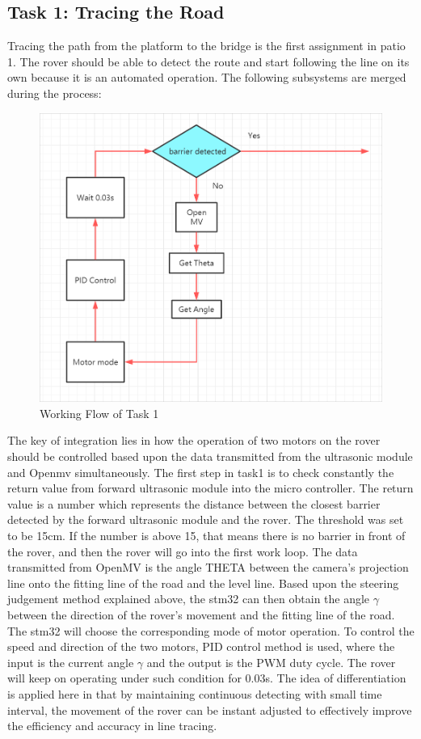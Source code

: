 \documentclass[12pt, a4paper, oneside]{report}
\begin{document}
\subsection{Task 1: Tracing the Road}
Tracing the path from the platform to the bridge is the first assignment in patio 1. The rover should be able to detect the route and start following the line on its own because it is an automated operation. The following subsystems are merged during the process:
\begin{figure}[H]
    \centering
    \includegraphics[scale=0.34]{pic/patio1/2.png}
    \caption{Working Flow of Task 1}
    \label{wft1}
\end{figure}

The key of integration lies in how the operation of two motors on the rover should be controlled based upon the data transmitted from the ultrasonic module and Openmv simultaneously. The first step in task1 is to check constantly the return value from forward ultrasonic module into the micro controller. The return value is a number which represents the distance between the closest barrier detected by the forward ultrasonic module and the rover. The threshold was set to be 15cm. If the number is above 15, that means there is no barrier in front of the rover, and then the rover will go into the first work loop. The data transmitted from OpenMV is the angle THETA  between the camera’s projection line onto the fitting line of the road and the level line. Based upon the steering judgement method explained above, the stm32 can then obtain the angle $\gamma$ between the direction of the rover’s movement and  the fitting line of the road. The stm32 will choose the corresponding mode of motor operation. To control the speed and direction of the two motors, PID control method is used, where the input is the current angle $\gamma$ and the output is the PWM duty cycle. The rover will keep on operating under such condition for 0.03s. The idea of differentiation is applied here in that by maintaining continuous detecting with small time interval, the movement of the rover can be instant adjusted to effectively improve the efficiency and accuracy in line tracing.
 
\end{document}

